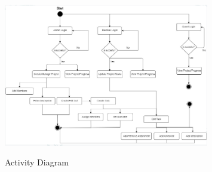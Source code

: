 \begin{figure}[!htbp]
    \centering
    \includegraphics[width = 0.8\textwidth]{actvDgm.png}\\[0.1in]
    \caption{Activity Diagram}
    \label{fig:my_label}
\end{figure}



